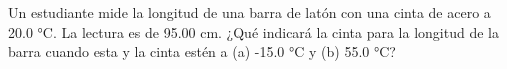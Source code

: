 \item Un estudiante mide la longitud de una barra de latón con una cinta de acero a 20.0 °C. La lectura es de 95.00 cm. ¿Qué indicará la cinta para la longitud de la barra cuando esta y la cinta estén a (a) -15.0 °C y (b) 55.0 °C?

